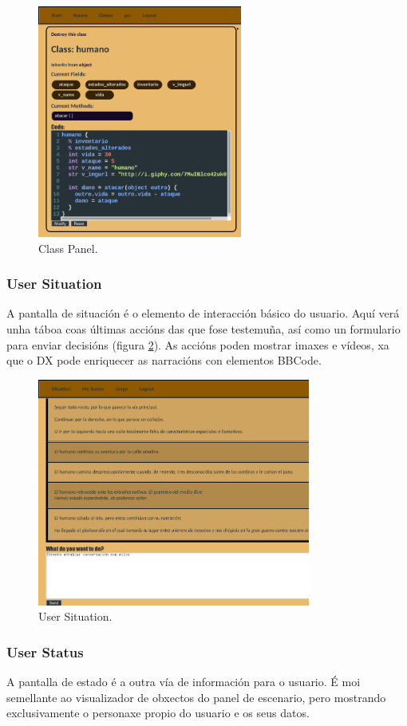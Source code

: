 \begin{figure}
\centerline{\includegraphics[width=0.6\textwidth]{figuras/demiurgo_classpanel.png}}
\caption{Class Panel.}
\label{fig:demiurgoclasspanel}
\end{figure}

\subsubsection{User Situation}
A pantalla de situación é o elemento de interacción básico do usuario. Aquí verá
unha táboa coas últimas accións das que fose testemuña, así como un formulario
para enviar decisións (figura \ref{fig:demiurgosituation}). As accións
poden mostrar imaxes e vídeos, xa que o DX pode enriquecer as narracións con
elementos BBCode.

\begin{figure}
\centerline{\includegraphics[width=0.8\textwidth]{figuras/demiurgo_situation.png}}
\caption{User Situation.}
\label{fig:demiurgosituation}
\end{figure}

\subsubsection{User Status}
A pantalla de estado é a outra vía de información para o usuario. É moi
semellante ao visualizador de obxectos do panel de escenario, pero mostrando
exclusivamente o personaxe propio do usuario e os seus datos.
